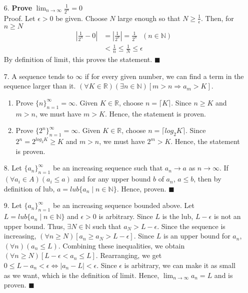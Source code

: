 \documentclass[11pt]{exam}
\begin{document}
\begin{enumerate}[leftmargin=0pt]
\item[6.] \textbf{Prove} $\lim_{n \to \infty} \frac{1}{2^n} = 0$ \\
Proof. Let $\epsilon > 0$ be given. Choose $N$ large enough so that $N \geq \frac{1}{\epsilon}$. Then, for $n \geq N$
\begin{align*}
    |\frac{1}{2^n} - 0| &= |\frac{1}{2^n}| = \frac{1}{2^n} \text{ $(n \in \mathbb{N})$} \\
    &< \frac{1}{n} \leq \frac{1}{N} \leq \epsilon
\end{align*}
By definition of limit, this proves the statement. $\blacksquare$

\item[7.] A sequence tends to $\infty$ if for every given number, we can find a term in the sequence larger than it. $(\forall K \in \mathbb{R})(\exists n \in \mathbb{N})[m > n \Rightarrow a_m > K]$.
\begin{enumerate}[label=(\alph*)]
    \item Prove $\{n\}_{n = 1}^{\infty} = \infty$. Given $K \in \mathbb{R}$, choose $n = \lceil K \rceil$. Since $n \geq K$ and $m > n$, we must have $m > K$. Hence, the statement is proven.
    \item Prove $\{2^n\}_{n = 1}^{\infty} = \infty$. Given $K \in \mathbb{R}$, choose $n = \lceil log_2 K \rceil$. Since $2^n = 2^{log_2 K} \geq K$ and $m > n$, we must have $2^m > K$. Hence, the statement is proven.
\end{enumerate}


\item[8.] Let $\{a_n\}_{n = 1}^{\infty}$ be an increasing sequence such that $a_n \to a$ as $n \to \infty$. If $(\forall a_i \in A)(a_i \leq a)$ and for any upper bound $b$ of $a_n$, $a \leq b$, then by definition of lub, $a = lub\{a_n \mid n \in \mathbb{N}\}$. Hence, proven. $\blacksquare$

\item[9.] Let $\{a_n\}_{n = 1}^{\infty}$ be an increasing sequence bounded above. Let $L = lub\{a_n \mid n \in \mathbb{N}\}$ and $\epsilon > 0$ is arbitrary. Since $L$ is the lub, $L - \epsilon$ is not an upper bound. Thus, $\exists N \in \mathbb{N}$ such that $a_N > L - \epsilon$. Since the sequence is increasing, $(\forall n \geq N)[a_n \geq a_N > L - \epsilon]$. Since $L$ is an upper bound for $a_n$, $(\forall n)(a_n \leq L)$. Combining these inequalities, we obtain $(\forall n \geq N)[L - \epsilon < a_n \leq L]$. Rearranging, we get $0 \leq L - a_n < \epsilon \Leftrightarrow |a_n - L| < \epsilon$. Since $\epsilon$ is arbitrary, we can make it as small as we want, which is the definition of limit. Hence, $\lim_{n \to \infty} a_n = L$ and is proven. $\blacksquare$

\end{enumerate}
\end{document}
